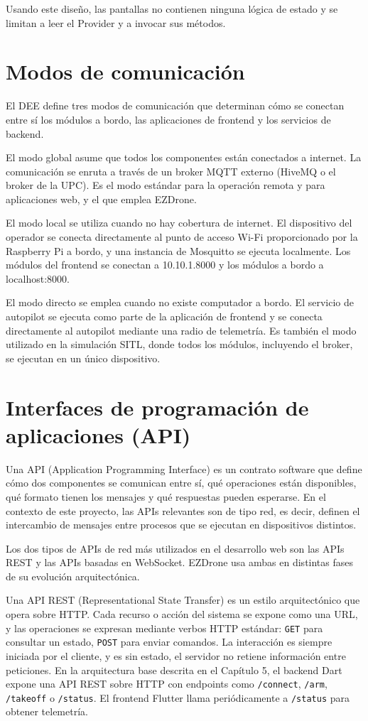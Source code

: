 Usando este diseño, las pantallas no contienen ninguna lógica de estado y se limitan a leer el Provider y a invocar sus métodos. 

\section{Modos de comunicación}
El DEE define tres modos de comunicación que determinan cómo se conectan entre sí los módulos a bordo, las aplicaciones de frontend y los servicios de backend.

El modo global asume que todos los componentes están conectados a internet. La comunicación se enruta a través de un broker MQTT externo (HiveMQ\cite{hivemq} o el broker de la UPC). Es el modo estándar para la operación remota y para aplicaciones web, y el que emplea EZDrone.

El modo local se utiliza cuando no hay cobertura de internet. El dispositivo del operador se conecta directamente al punto de acceso Wi-Fi proporcionado por la Raspberry Pi a bordo, y una instancia de Mosquitto\cite{mosquitto} se ejecuta localmente. Los módulos del frontend se conectan a 10.10.1.8000 y los módulos a bordo a localhost:8000.

El modo directo se emplea cuando no existe computador a bordo. El servicio de autopilot se ejecuta como parte de la aplicación de frontend y se conecta directamente al autopilot mediante una radio de telemetría. Es también el modo utilizado en la simulación SITL\cite{ardupilot_sitl}, donde todos los módulos, incluyendo el broker, se ejecutan en un único dispositivo.

\section{Interfaces de programación de aplicaciones (API)}
Una API (Application Programming Interface)\cite{api} es un contrato software que define cómo dos componentes se comunican entre sí, qué operaciones están disponibles, qué formato tienen los mensajes y qué respuestas pueden esperarse. En el contexto de este proyecto, las APIs relevantes son de tipo red, es decir, definen el intercambio de mensajes entre procesos que se ejecutan en dispositivos distintos.

Los dos tipos de APIs de red más utilizados en el desarrollo web son las APIs REST y las APIs basadas en WebSocket. EZDrone usa ambas en distintas fases de su evolución arquitectónica.

Una API REST (Representational State Transfer)\cite{apirest} es un estilo arquitectónico que opera sobre HTTP. Cada recurso o acción del sistema se expone como una URL, y las operaciones se expresan mediante verbos HTTP estándar: \texttt{GET} para consultar un estado, \texttt{POST} para enviar comandos. La interacción es siempre iniciada por el cliente, y es sin estado, el servidor no retiene información entre peticiones. En la arquitectura base descrita en el Capítulo 5, el backend Dart expone una API REST sobre HTTP con endpoints como \texttt{/connect}, \texttt{/arm}, \texttt{/takeoff} o \texttt{/status}. El frontend Flutter llama periódicamente a \texttt{/status} para obtener telemetría.

